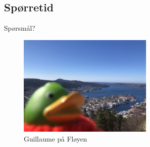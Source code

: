 \subsection*{Spørretid}
\begin{frame}{Spørsmål?}
    \begin{figure}
        \centering
        \includegraphics[height = 4.9cm]{images/guillaume10.jpg}
        \caption{Guillaume på Fløyen}
        \label{fig:guillaume10}
    \end{figure}
\end{frame}